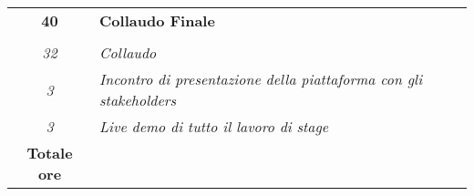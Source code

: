 \begin{tabularx}{\textwidth}{|c|X|}
    \textbf{40} & \textbf{Collaudo Finale}  \\ \hdashline 
    \multirow{4}{0cm}\\ 
    \textit{32} & 
    \textit{Collaudo} \\
    \textit{3} & 
    \textit{Incontro di presentazione della piattaforma con gli stakeholders} \\
    \textit{3} & 
    \textit{Live demo di tutto il lavoro di stage} \\
    \hline
	
	\textbf{Totale ore} & \multicolumn{1}{|c|}{\textbf{\totaleOre}} \\\hline
	
	
\end{tabularx}